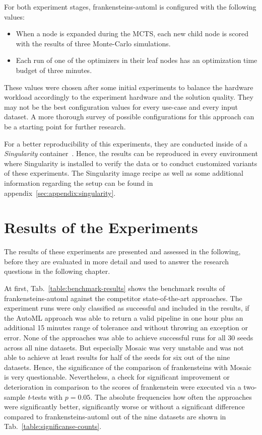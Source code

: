 For both experiment stages, frankensteins-automl is configured with the following values:
\begin{itemize}
    \item When a node is expanded during the MCTS, each new child node is scored with the results of three Monte-Carlo simulations.
    \item Each run of one of the optimizers in their leaf nodes has an optimization time budget of three minutes.
\end{itemize}
These values were chosen after some initial experiments to balance the hardware workload accordingly to the experiment hardware and the solution quality.
They may not be the best configuration values for every use-case and every input dataset.
A more thorough survey of possible configurations for this approach can be a starting point for further research.

For a better reproducibility of this experiments, they are conducted inside of a \textit{Singularity} container~\cite{Kurtzer-Singularity}.
Hence, the results can be reproduced in every environment where Singularity is installed to verify the data or to conduct customized variants of these experiments.
The Singularity image recipe as well as some additional information regarding the setup can be found in appendix~\ref{sec:appendix:singularity}.

\section{Results of the Experiments}
\label{sec:evaluation:results}
 The results of these experiments are presented and assessed in the following, before they are evaluated in more detail and used to answer the research questions in the following chapter.

 At first, Tab.~\ref{table:benchmark-results} shows the benchmark results of frankensteins-automl against the competitor state-of-the-art approaches.
 The experiment runs were only classified as successful and included in the results, if the AutoML approach was able to return a valid pipeline in one hour plus an additional 15 minutes range of tolerance and without throwing an exception or error.\newline
 None of the approaches was able to achieve successful runs for all 30 seeds across all nine datasets.
 But especially Mosaic was very unstable and was not able to achieve at least results for half of the seeds for six out of the nine datasets.
 Hence, the significance of the comparison of frankensteins with Mosaic is very questionable.\newline
 Nevertheless, a check for significant improvement or deterioration in comparison to the scores of frankenstein were executed via a two-sample \textit{t}-tests with $p = 0.05$.
 The absolute frequencies how often the approaches were significantly better, significantly worse or without a significant difference compared to frankensteins-automl out of the nine datasets are shown in Tab.~\ref{table:significanse-counts}.

